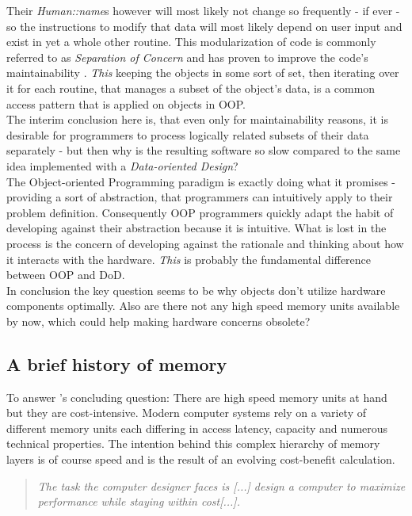 Their \textit{Human::name}s however will most likely not change so frequently - if ever - so the instructions to modify that data will most likely depend on user input and exist in yet a whole other routine. This modularization of code is commonly referred to as \textit{Separation of Concern} and has proven to improve the code's maintainability .
\textit{This} keeping the objects in some sort of set, then iterating over it for each routine, that manages a subset of the object's data, is a common access pattern that is applied on objects in OOP.\\
The interim conclusion here is, that even only for maintainability reasons, it is desirable for programmers to process logically related subsets of their data separately - but then why is the resulting software so slow compared to the same idea implemented with a \textit{Data-oriented Design}?\\
The Object-oriented Programming paradigm is exactly doing what it promises - providing a sort of abstraction, that programmers can intuitively apply to their problem definition. Consequently OOP programmers quickly adapt the habit of developing against their abstraction because it is intuitive. What is lost in the process is the concern of developing against the rationale and thinking about how it interacts with the hardware. \textit{This} is probably the fundamental difference between OOP and DoD.\\
In conclusion the key question seems to be why objects don't utilize hardware components  optimally. Also are there not any high speed memory units available by now, which could help making hardware concerns obsolete?

\subsection{A brief history of memory}
To answer 's concluding question: There are high speed memory units at hand but they are cost-intensive. Modern computer systems rely on a variety of different memory units each differing in access latency, capacity and numerous technical properties. The intention behind this complex hierarchy of memory layers is of course speed and is the result of an evolving cost-benefit calculation.
\begin{quote}
	\textit{The task the computer designer faces is [...] design a computer to maximize
		performance while staying within cost[...].} 
\end{quote}


